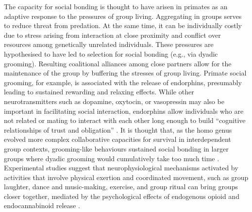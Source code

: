 The capacity for social bonding is thought to have arisen in primates as an adaptive response to the pressures of group living.  Aggregating in groups serves to reduce threat from predation.  At the same time, it can be individually costly due to stress arising from interaction at close proximity and conflict over resources among genetically unrelated individuals.  These pressures are hypothesised to have led to selection for social bonding (e.g., via dyadic grooming). Resulting coalitional alliances among close partners allow for the maintenance of the group by buffering the stresses of group living.  Primate social grooming, for example, is associated with the release of endorphins, presumably leading to sustained rewarding and relaxing effects.  While other neurotransmitters such as dopamine, oxytocin, or vasopressin may also be important in facilitating social interaction, endorphins allow individuals who are not related or mating to interact with each other long enough to build ``cognitive relationships of trust and obligation'' \citep[1839]{Dunbar2012}.  It is thought that, as the homo genus evolved more complex collaborative capacities for survival in interdependent group contexts, grooming-like behaviours sustained social bonding in larger groups where dyadic grooming would cumulatively take too much time \citep{Dunbar2012}.
Experimental studies suggest that neurophysiological mechanisms activated by activities that involve physical exertion and coordinated movement, such as group laughter, dance and music-making, exercise, and group ritual can bring groups closer together, mediated by the psychological effects of endogenous opioid and endocannabinoid release \citep{Cohen2009,Fischer2014a,Fischer2014,Sullivan2014,Tarr2016,Tarr2015}.

